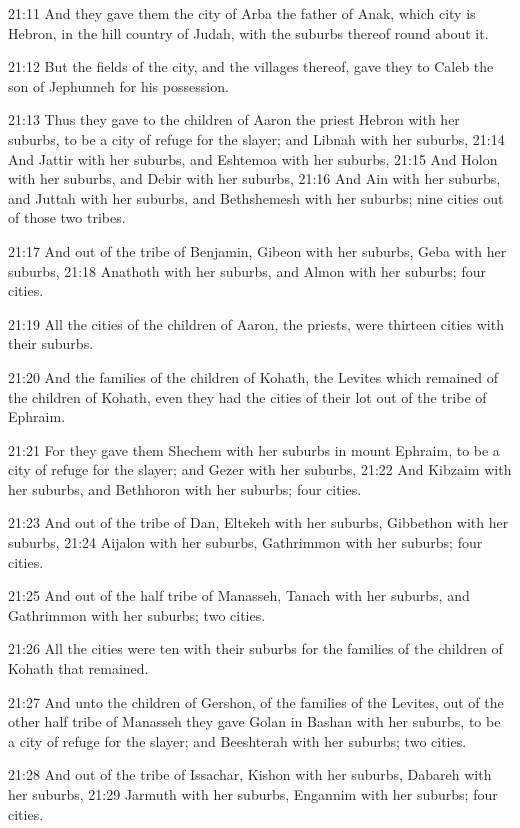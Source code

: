 21:11 And they gave them the city of Arba the father of Anak, which
city is Hebron, in the hill country of Judah, with the suburbs thereof
round about it.

21:12 But the fields of the city, and the villages thereof, gave they
to Caleb the son of Jephunneh for his possession.

21:13 Thus they gave to the children of Aaron the priest Hebron with
her suburbs, to be a city of refuge for the slayer; and Libnah with
her suburbs, 21:14 And Jattir with her suburbs, and Eshtemoa with her
suburbs, 21:15 And Holon with her suburbs, and Debir with her suburbs,
21:16 And Ain with her suburbs, and Juttah with her suburbs, and
Bethshemesh with her suburbs; nine cities out of those two tribes.

21:17 And out of the tribe of Benjamin, Gibeon with her suburbs, Geba
with her suburbs, 21:18 Anathoth with her suburbs, and Almon with her
suburbs; four cities.

21:19 All the cities of the children of Aaron, the priests, were
thirteen cities with their suburbs.

21:20 And the families of the children of Kohath, the Levites which
remained of the children of Kohath, even they had the cities of their
lot out of the tribe of Ephraim.

21:21 For they gave them Shechem with her suburbs in mount Ephraim, to
be a city of refuge for the slayer; and Gezer with her suburbs, 21:22
And Kibzaim with her suburbs, and Bethhoron with her suburbs; four
cities.

21:23 And out of the tribe of Dan, Eltekeh with her suburbs, Gibbethon
with her suburbs, 21:24 Aijalon with her suburbs, Gathrimmon with her
suburbs; four cities.

21:25 And out of the half tribe of Manasseh, Tanach with her suburbs,
and Gathrimmon with her suburbs; two cities.

21:26 All the cities were ten with their suburbs for the families of
the children of Kohath that remained.

21:27 And unto the children of Gershon, of the families of the
Levites, out of the other half tribe of Manasseh they gave Golan in
Bashan with her suburbs, to be a city of refuge for the slayer; and
Beeshterah with her suburbs; two cities.

21:28 And out of the tribe of Issachar, Kishon with her suburbs,
Dabareh with her suburbs, 21:29 Jarmuth with her suburbs, Engannim
with her suburbs; four cities.

